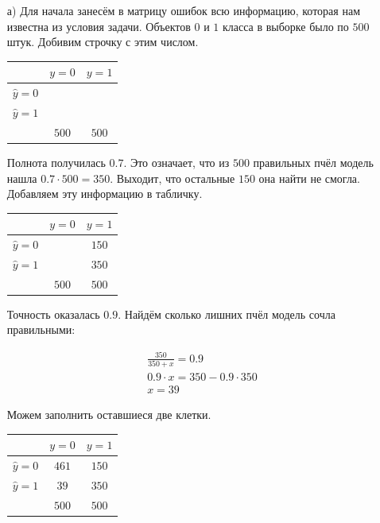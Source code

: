 \documentclass[12pt, a4paper, oneside]{article}
\theoremstyle{plain} %
\theoremstyle{definition}
\begin{document}
\begin{solution}
\begin{enumerate} 
\item[а)] Для начала занесём в матрицу ошибок всю информацию, которая нам известна из условия задачи. Объектов $0$ и $1$ класса в выборке было по $500$ штук. Добивим строчку с этим числом. 

\begin{center}
    \begin{tabular}{|c|c|c|}
    	\hline
    	& $y=0$  &  $ y = 1$  \\  \hline 
    	$\hat y = 0$  & &  \\      \hline 
    	$\hat y = 1$ & &   \\ \hline 
         	& $500$ & $500$ \\ \hline 
    \end{tabular}
\end{center} 

Полнота получилась $0.7$. Это означает, что из $500$ правильных пчёл модель нашла $0.7 \cdot 500 = 350$. Выходит, что остальные $150$ она найти не смогла. Добавляем эту информацию в табличку. 

\begin{center}
    \begin{tabular}{|c|c|c|}
    	\hline
    	& $y=0$  &  $ y = 1$  \\  \hline 
    	$\hat y = 0$  & & $150$ \\      \hline 
    	$\hat y = 1$ & &  $350$ \\ \hline 
         	& $500$ & $500$ \\ \hline 
    \end{tabular}
\end{center} 

Точность оказалась $0.9$. Найдём сколько лишних пчёл модель сочла правильными: 

\begin{equation*}
\begin{aligned}
&\frac{350}{350 + x} = 0.9 \\
&0.9 \cdot x = 350 - 0.9 \cdot 350 \\
&x = 39
\end{aligned}
\end{equation*}

Можем заполнить оставшиеся две клетки.

\begin{center}
    \begin{tabular}{|c|c|c|}
    	\hline
    	& $y=0$  &  $ y = 1$  \\  \hline 
    	$\hat y = 0$  & $461$ & $150$ \\      \hline 
    	$\hat y = 1$ & $39$ &  $350$ \\ \hline 
         	& $500$ & $500$ \\ \hline 
    \end{tabular}
\end{center} 


\end{enumerate}
\end{solution}
\end{document}

